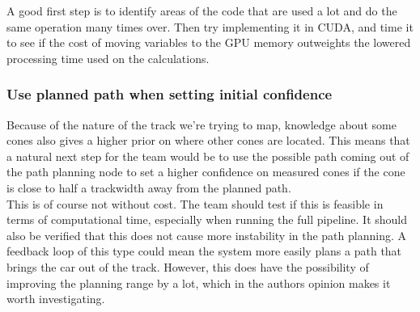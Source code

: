 A good first step is to identify areas of the code that are used a lot and do the same operation many times over. Then try implementing it in CUDA, and time it to see if the cost of moving variables to the GPU memory outweights the lowered processing time used on the calculations. 

\subsubsection{Use planned path when setting initial confidence}
Because of the nature of the track we're trying to map, knowledge about some cones also gives a higher prior on where other cones are located. This means that a natural next step for the team would be to use the possible path coming out of the path planning node to set a higher confidence on measured cones if the cone is close to half a trackwidth away from the planned path. \\

This is of course not without cost. The team should test if this is feasible in terms of computational time, especially when running the full pipeline. It should also be verified that this does not cause more instability in the path planning. A feedback loop of this type could mean the system more easily plans a path that brings the car out of the track. However, this does have the possibility of improving the planning range by a lot, which in the authors opinion makes it worth investigating.